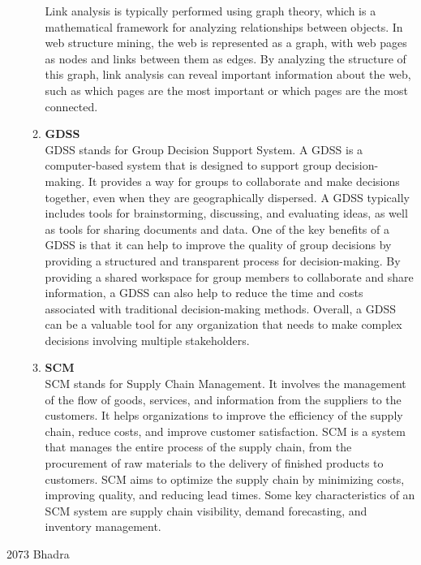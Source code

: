 \documentclass[12pt]{article}
\begin{document}
\begin{enumerate}
\begin{enumerate}
Link analysis is typically performed using graph theory, which is a mathematical framework for analyzing relationships between objects. In web structure mining, the web is represented as a graph, with web pages as nodes and links between them as edges. By analyzing the structure of this graph, link analysis can reveal important information about the web, such as which pages are the most important or which pages are the most connected.
        \item {\bfseries GDSS\\}
        GDSS stands for Group Decision Support System. A GDSS is a computer-based system that is designed to support group decision-making. It provides a way for groups to collaborate and make decisions together, even when they are geographically dispersed. A GDSS typically includes tools for brainstorming, discussing, and evaluating ideas, as well as tools for sharing documents and data. One of the key benefits of a GDSS is that it can help to improve the quality of group decisions by providing a structured and transparent process for decision-making. By providing a shared workspace for group members to collaborate and share information, a GDSS can also help to reduce the time and costs associated with traditional decision-making methods. Overall, a GDSS can be a valuable tool for any organization that needs to make complex decisions involving multiple stakeholders.
        \item {\bfseries SCM \\}
        SCM stands for Supply Chain Management. It involves the management of the flow of goods, services, and information from the suppliers to the customers. It helps organizations to improve the efficiency of the supply chain, reduce costs, and improve customer satisfaction. SCM is a system that manages the entire process of the supply chain, from the procurement of raw materials to the delivery of finished products to customers. SCM aims to optimize the supply chain by minimizing costs, improving quality, and reducing lead times. Some key characteristics of an SCM system are supply chain visibility, demand forecasting, and inventory management.
    \end{enumerate}
\end{enumerate}
\pagebreak
{\Large 2073 Bhadra}
\end{document}
